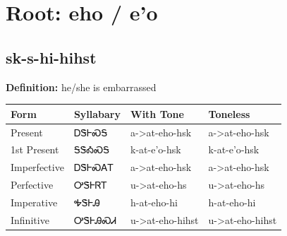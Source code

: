 \documentclass{article}%
\begin{document}
%
\normalsize%
\section*{Root: eho / e'o}%
\subsection*{sk-s-hi-hihst}%
\textbf{Definition: }%
he/she is embarrassed%
\\[0.5em]%
\begin{tabular}{|l|l|l|l|}%
\hline%
\textbf{Form}&\textbf{Syllabary}&\textbf{With Tone}&\textbf{Toneless}\\%
\hline%
Present&ᎠᏕᎰᏍᎦ&a{-}>at{-}eho{-}hsk&a{-}>at{-}eho{-}hsk\\%
1st Present&ᎦᏕᎣᏍᎦ&k{-}at{-}e'o{-}hsk&k{-}at{-}e'o{-}hsk\\%
Imperfective&ᎠᏕᎰᏍᎪᎢ&a{-}>at{-}eho{-}hsk&a{-}>at{-}eho{-}hsk\\%
Perfective&ᎤᏕᎰᏒᎢ&u{-}>at{-}eho{-}hs&u{-}>at{-}eho{-}hs\\%
Imperative&ᎭᏕᎰᎯ&h{-}at{-}eho{-}hi&h{-}at{-}eho{-}hi\\%
Infinitive&ᎤᏕᎰᎯᏍᏗ&u{-}>at{-}eho{-}hihst&u{-}>at{-}eho{-}hihst\\%
\hline%
\end{tabular}%
\\[1em]%
\end{document}
